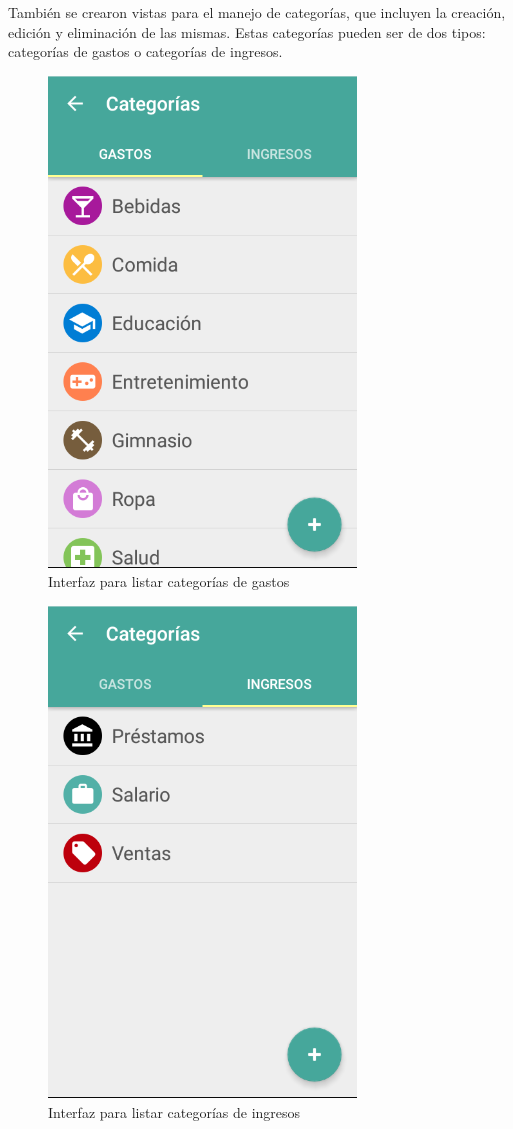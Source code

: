 También se crearon vistas para el manejo de categorías, que incluyen la creación, edición y eliminación de las mismas. Estas categorías pueden ser de dos tipos: categorías de gastos o categorías de ingresos.

\begin{figure}[ht]
  \centering
  \includegraphics[scale=0.45,type=png,ext=.png,read=.png]{imagenes/expense_categories}
  \caption{Interfaz para listar categorías de gastos}
  \label{fig:interfazListarCategoriasGastos}
\end{figure}

\begin{figure}[ht]
  \centering
  \includegraphics[scale=0.45,type=png,ext=.png,read=.png]{imagenes/income_categories}
  \caption{Interfaz para listar categorías de ingresos}
  \label{fig:interfazListarCategoriasIngresos}
\end{figure}


